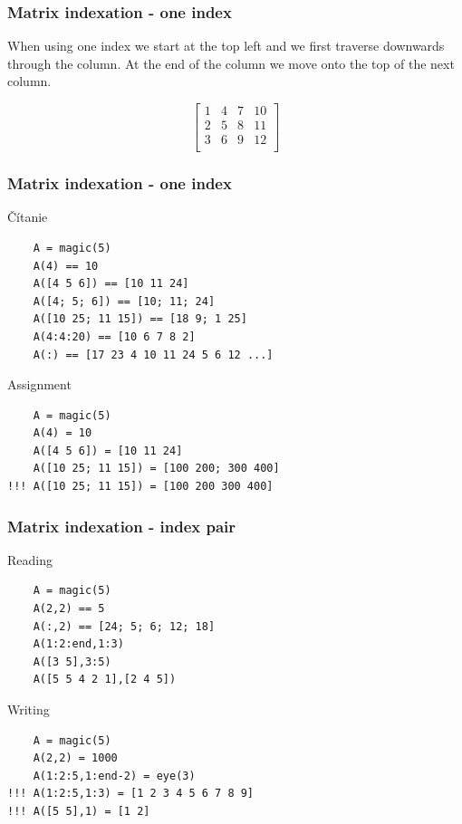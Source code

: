 \documentclass{beamer}
\begin{document}
\begin{frame}[fragile]
\frametitle{Matrix indexation - one index}

  \centering
  When using one index we start at the top left and we first traverse downwards through the column. At the end of the column we move onto the top of the next column.
    
  $$\begin{bmatrix}
       1 & 4 & 7 & 10 \\[0.3em]
       2 & 5 & 8 & 11 \\[0.3em]
       3 & 6 & 9 & 12 \\[0.3em]
     \end{bmatrix} $$
\end{frame}

\begin{frame}[fragile]
\frametitle{Matrix indexation - one index}    
  \begin{block}{Čítanie}
  \begin{verbatim}
    A = magic(5)
    A(4) == 10
    A([4 5 6]) == [10 11 24]
    A([4; 5; 6]) == [10; 11; 24]
    A([10 25; 11 15]) == [18 9; 1 25]
    A(4:4:20) == [10 6 7 8 2]
    A(:) == [17 23 4 10 11 24 5 6 12 ...]\end{verbatim}
  \end{block}
  
\begin{block}{Assignment}
  \begin{verbatim}
    A = magic(5)
    A(4) = 10
    A([4 5 6]) = [10 11 24]
    A([10 25; 11 15]) = [100 200; 300 400]
!!! A([10 25; 11 15]) = [100 200 300 400]\end{verbatim}
  \end{block}
\end{frame}

\begin{frame}[fragile]
\frametitle{Matrix indexation - index pair}    
  \begin{block}{Reading}
  \begin{verbatim}
    A = magic(5)
    A(2,2) == 5
    A(:,2) == [24; 5; 6; 12; 18]
    A(1:2:end,1:3)
    A([3 5],3:5)
    A([5 5 4 2 1],[2 4 5])\end{verbatim}
  \end{block}
  
\begin{block}{Writing}
  \begin{verbatim}
    A = magic(5)
    A(2,2) = 1000
    A(1:2:5,1:end-2) = eye(3)
!!! A(1:2:5,1:3) = [1 2 3 4 5 6 7 8 9]
!!! A([5 5],1) = [1 2]\end{verbatim}
  \end{block}   
\end{frame}
\end{document}
